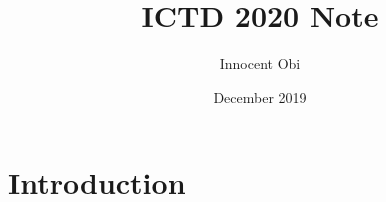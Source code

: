 \documentclass{article}
\title{ICTD 2020 Note}
\author{Innocent Obi}
\date{December 2019}
\begin{document}
\maketitle

\section{Introduction}
\end{document}

